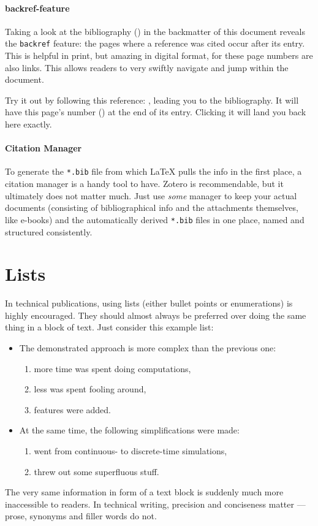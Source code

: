 \paragraph{backref-feature}
Taking a look at the bibliography () in the backmatter
of this document reveals the \texttt{backref} feature:
the pages where a reference was cited occur after its entry.
This is helpful in print, but amazing in digital format, for these page numbers
are also links.
This allows readers to very swiftly navigate and jump within the document.

Try it out by following this reference: \cite{dirac_principles_1981},
leading you to the bibliography.
\label{backref_example}
It will have this page's number () at the end of its entry.
Clicking it will land you back here exactly.

\paragraph{Citation Manager}
To generate the \texttt{*.bib} file from which \LaTeX{} pulls the info in the
first place, a citation manager is a handy tool to have.
Zotero is recommendable, but it ultimately does not matter much.
Just use \emph{some} manager to keep your actual documents
(consisting of bibliographical info and the attachments themselves, like e-books)
and the automatically derived \texttt{*.bib} files in one place,
named and structured consistently.

\section{Lists}

In technical publications, using lists (either bullet points or enumerations)
is highly encouraged.
They should almost always be preferred over doing the same thing in a block of text.
Just consider this example list:
\begin{itemize}
    \item The demonstrated approach is more complex than the previous one:
    \begin{enumerate}
        \item more time was spent doing computations,
        \item less was spent fooling around,
        \item features were added.
    \end{enumerate}
    \item At the same time, the following simplifications were made:
    \begin{enumerate}
        \item went from continuous- to discrete-time simulations,
        \item threw out some superfluous stuff.
    \end{enumerate}
\end{itemize}
The very same information in form of a text block is suddenly much more inaccessible
to readers.
In technical writing, precision and conciseness matter --- prose, synonyms and
filler words do not.

